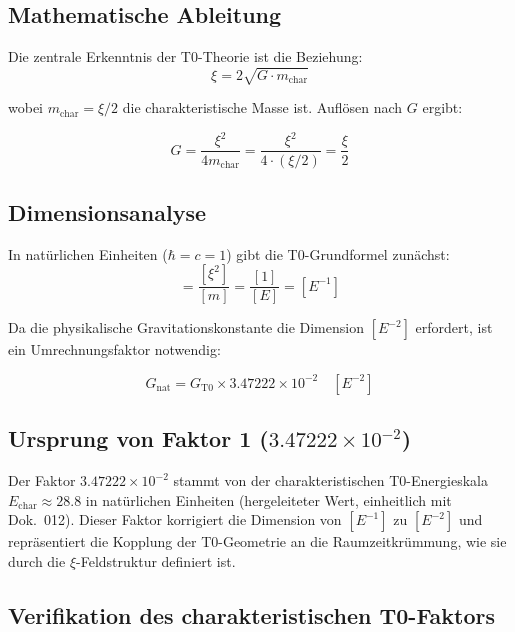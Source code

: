 	\subsection{Mathematische Ableitung}
	
	Die zentrale Erkenntnis der T0-Theorie ist die Beziehung:
	\begin{equation}
		\xi = 2\sqrt{G \cdot m_{\text{char}}}
	\end{equation}
	
	wobei $m_{\text{char}} = \xi/2$ die charakteristische Masse ist. Auflösen nach $G$ ergibt:
	
	\begin{equation}
		\boxed{G = \frac{\xi^2}{4m_{\text{char}}} = \frac{\xi^2}{4 \cdot (\xi/2)} = \frac{\xi}{2}}
	\end{equation}
	
	\subsection{Dimensionsanalyse}
	
	In natürlichen Einheiten ($\hbar = c = 1$) gibt die T0-Grundformel zunächst:
	\begin{equation}
		[G_{\text{T0}}] = \frac{[\xi^2]}{[m]} = \frac{[1]}{[E]} = [E^{-1}]
	\end{equation}
	
	Da die physikalische Gravitationskonstante die Dimension $[E^{-2}]$ erfordert, ist ein Umrechnungsfaktor notwendig:
	
	\begin{equation}
		G_{\text{nat}} = G_{\text{T0}} \times 3.47222 \times 10^{-2} \quad [E^{-2}]
	\end{equation}
	
	\subsection{Ursprung von Faktor 1 ($3.47222 \times 10^{-2}$)}

	Der Faktor $3.47222 \times 10^{-2}$ stammt von der charakteristischen T0-Energieskala $E_{\text{char}} \approx 28.8$ in natürlichen Einheiten (hergeleiteter Wert, einheitlich mit Dok.~012). Dieser Faktor korrigiert die Dimension von $[E^{-1}]$ zu $[E^{-2}]$ und repräsentiert die Kopplung der T0-Geometrie an die Raumzeitkrümmung, wie sie durch die $\xi$-Feldstruktur definiert ist.
	
	\subsection{Verifikation des charakteristischen T0-Faktors}
	
